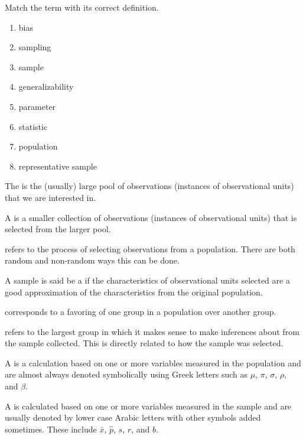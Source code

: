 \documentclass[11pt]{exam}
\begin{document}
\noprintanswers   %


\headrule
\footer{}{}{}

\renewcommand{\theenumi}{\Alph{enumi}}

Match the term with its correct definition.

\begin{enumerate}
	\item bias
	\item sampling
	\item sample
	\item generalizability
	\item parameter
	\item statistic
	\item population
	\item representative sample
\end{enumerate}

\begin{questions}

\question The  \fillin is the (usually) large pool of observations (instances of observational units) that we are interested in.

\question A  \fillin  is a smaller collection of observations (instances of observational units) that is selected from the larger pool.

\question  \fillin  refers to the process of selecting observations from a population.  There are both random and non-random ways this can be done.

\question A sample is said be a  \fillin  if the characteristics of observational units selected are a good approximation of the characteristics from the original population.

\question \fillin corresponds to a favoring of one group in a population over another group.

\question \fillin refers to the largest group in which it makes sense to make inferences about from the sample collected.  This is directly related to how the sample was selected.

\question A 
\fillin is a calculation based on one or more variables measured in the population and  are almost always denoted symbolically using Greek letters such as $\mu$, $\pi$, $\sigma$, $\rho$, and $\beta$.

\question A \fillin is calculated based on one or more variables measured in the sample and are usually denoted by lower case Arabic letters with other symbols added sometimes.  These include $\bar{x}$, $\hat{p}$, $s$, $r$, and $b$. 

\end{questions}
\end{document}
